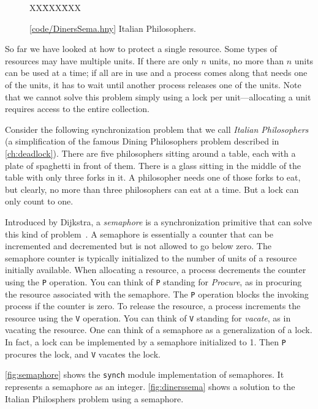 \documentclass{report}
\newcommand{\harmonysource}[1]{
\begin{tabbing}
XX\=XXX\=XXX\kill
    
\end{tabbing}
}
\newcommand{\harmonylink}[1]{%
[\href{https://www.cs.cornell.edu/home/rvr/harmony/#1}{\underline{#1}}]%
}
\newenvironment{code}{
\tcolorbox
}{
\endtcolorbox
}
\begin{document}
\begin{figure}
\begin{code}
\harmonysource{DinersSema}
\end{code}
\caption{\harmonylink{code/DinersSema.hny} Italian Philosophers.}
\label{fig:dinerssema}
\end{figure}

So far we have looked at how to protect a single resource.
Some types of resources may have multiple units.
If there are only $n$ units, no more than $n$ units can be used at a time;
if all are in use and a process comes along that needs one of the units,
it has to wait until another process releases one of the units.
Note that we cannot solve this problem simply using a lock per unit---allocating
a unit requires access to the entire collection.

Consider the following synchronization problem that we call
\emph{Italian Philosophers} (a simplification of
the famous Dining Philosophers problem described in \autoref{ch:deadlock}).
There are five philosophers sitting around a table, each with a plate of
spaghetti in front of them.
There is a glass sitting in the middle of the table with only
three forks in it.  A philosopher needs one of those forks to eat, but clearly,
no more than three philosophers can eat at a time.
But a lock can only count to one.

Introduced by Dijkstra,
a \emph{semaphore} is a synchronization primitive that
can solve this kind of problem~\cite{EWD35}.
A semaphore is essentially
a counter that can be incremented and decremented but is not allowed to go
below zero.  The semaphore counter is typically initialized to the number of
units of a resource initially available.
When allocating a resource, a process decrements the
counter using the \texttt{P}
%
%
operation.  You can think of \texttt{P} standing
for \emph{Procure}, as in procuring the resource associated with the semaphore.
The \texttt{P} operation blocks the invoking process if the counter is zero.
To release the resource, a process increments the resource using the
\texttt{V}
%
%
operation.  You can think of \texttt{V} standing for \emph{vacate},
as in vacating the resource.
One can think of a semaphore as a generalization of a lock.  In fact, a
lock can be implemented by a semaphore initialized to 1.  Then \texttt{P}
procures the lock, and \texttt{V} vacates the lock.

\autoref{fig:semaphore} shows the \texttt{synch} module implementation of
semaphores.
It represents a semaphore as an integer.
\autoref{fig:dinerssema} shows a solution to the Italian Philosphers problem
using a semaphore.
\end{document}
